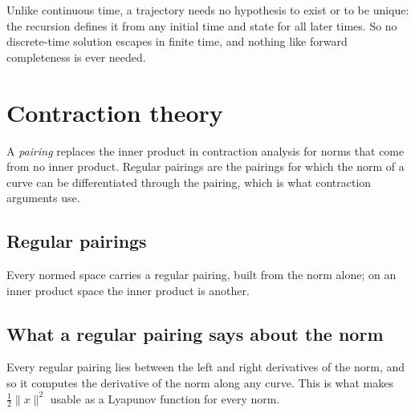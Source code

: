 Unlike continuous time, a trajectory needs no hypothesis to exist or to be unique: the recursion
defines it from any initial time and state for all later times.  So no discrete-time solution
escapes in finite time, and nothing like forward completeness is ever needed.






\chapter{Contraction theory}

A \emph{pairing} replaces the inner product in contraction analysis for norms that come from no
inner product.  Regular pairings are the pairings for which the norm of a curve can be
differentiated through the pairing, which is what contraction arguments use.

\section{Regular pairings}


Every normed space carries a regular pairing, built from the norm alone; on an inner product space
the inner product is another.


\section{What a regular pairing says about the norm}

Every regular pairing lies between the left and right derivatives of the norm, and so it computes
the derivative of the norm along any curve.  This is what makes $\frac12 \|x\|^2$ usable as a
Lyapunov function for every norm.

